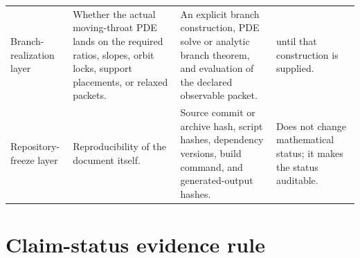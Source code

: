 \begin{longtable}{@{}L{0.17\textwidth}L{0.23\textwidth}L{0.36\textwidth}L{0.16\textwidth}@{}}
\addlinespace
Branch-realization layer & Whether the actual moving-throat PDE lands on the required ratios, slopes, orbit locks, support placements, or relaxed packets. & An explicit branch construction, PDE solve or analytic branch theorem, and evaluation of the declared observable packet. & \StatusOpen{} until that construction is supplied. \\
\addlinespace
Repository-freeze layer & Reproducibility of the document itself. & Source commit or archive hash, script hashes, dependency versions, build command, and generated-output hashes. & Does not change mathematical status; it makes the status auditable. \\
\bottomrule
\end{longtable}

\section{Claim-status evidence rule}
\label{sec:claim-status-evidence-rule}

